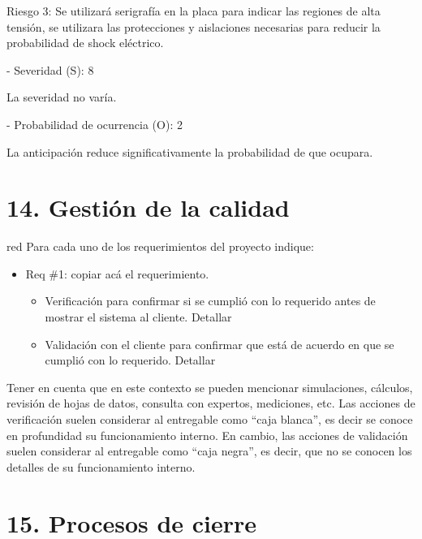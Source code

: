 \documentclass[
11pt, %
codirector, %
]{charter}
\begin{document}
	Riesgo 3: Se utilizará serigrafía en la placa para indicar las regiones de alta tensión, se utilizara las protecciones y aislaciones necesarias para reducir la probabilidad de shock eléctrico.

	- Severidad (S): 8
	
	La severidad no varía.
	
	- Probabilidad de ocurrencia (O): 2
	
	La anticipación reduce significativamente la probabilidad de que ocupara.


\section{14. Gestión de la calidad}
\label{sec:calidad}

\begin{consigna}{red}
	Para cada uno de los requerimientos del proyecto indique:
	\begin{itemize}
		\item Req \#1: copiar acá el requerimiento.

		      \begin{itemize}
			      \item Verificación para confirmar si se cumplió con lo requerido antes de mostrar el sistema al cliente. Detallar
			      \item Validación con el cliente para confirmar que está de acuerdo en que se cumplió con lo requerido. Detallar
		      \end{itemize}

	\end{itemize}

	Tener en cuenta que en este contexto se pueden mencionar simulaciones, cálculos, revisión de hojas de datos, consulta con expertos, mediciones, etc.  Las acciones de verificación suelen considerar al entregable como ``caja blanca'', es decir se conoce en profundidad su funcionamiento interno.  En cambio, las acciones de validación suelen considerar al entregable como ``caja negra'', es decir, que no se conocen los detalles de su funcionamiento interno.

\end{consigna}

\section{15. Procesos de cierre}
\label{sec:cierre}
\end{document}
